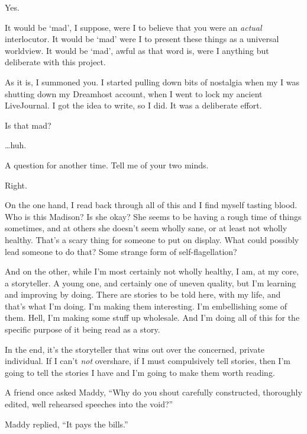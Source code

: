 \begin{paracol}{2}
\begin{leftcolumn}
\begin{ally}
Yes.
\end{ally}
It would be `mad', I suppose, were I to believe that you were an \emph{actual} interlocutor. It would be `mad' were I to present these things as a universal worldview. It would be `mad', awful as that word is, were I anything but deliberate with this project.

As it is, I summoned you. I started pulling down bits of nostalgia when my I was shutting down my Dreamhost account, when I went to lock my ancient LiveJournal. I got the idea to write, so I did. It was a deliberate effort.

\begin{ally}
Is that mad?
\end{ally}
\ldots{}huh.

\begin{ally}
A question for another time. Tell me of your two minds.
\end{ally}
Right.

On the one hand, I read back through all of this and I find myself tasting blood. Who is this Madison? Is she okay? She seems to be having a rough time of things sometimes, and at others she doesn't seem wholly sane, or at least not wholly healthy. That's a scary thing for someone to put on display. What could possibly lead someone to do that? Some strange form of self-flagellation?

And on the other, while I'm most certainly not wholly healthy, I am, at my core, a storyteller. A young one, and certainly one of uneven quality, but I'm learning and improving by doing. There are stories to be told here, with my life, and that's what I'm doing. I'm making them interesting. I'm embellishing some of them. Hell, I'm making some stuff up wholesale. And I'm doing all of this for the specific purpose of it being read as a story.

In the end, it's the storyteller that wins out over the concerned, private individual. If I can't \emph{not} overshare, if I must compulsively tell stories, then I'm going to tell the stories I have and I'm going to make them worth reading.

\begin{ally}
A friend once asked Maddy, ``Why do you shout carefully constructed, thoroughly edited, well rehearsed speeches into the void?''
\end{ally}
Maddy replied, ``It pays the bills.''
\newpage
  \end{leftcolumn}
\end{paracol}
